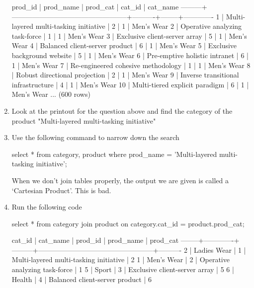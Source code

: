 \begin{enumerate}
\begin{pseudo*}
 prod_id |                    prod_name                     | prod_cat | cat_id |  cat_name     
---------+--------------------------------------------------+----------+--------+-------------  
       1 | Multi-layered multi-tasking initiative           |        2 |      1 | Men's Wear    
       2 | Operative analyzing task-force                   |        1 |      1 | Men's Wear    
       3 | Exclusive client-server array                    |        5 |      1 | Men's Wear    
       4 | Balanced client-server product                   |        6 |      1 | Men's Wear    
       5 | Exclusive background website                     |        5 |      1 | Men's Wear    
       6 | Pre-emptive holistic intranet                    |        6 |      1 | Men's Wear    
       7 | Re-engineered cohesive methodology               |        1 |      1 | Men's Wear    
       8 | Robust directional projection                    |        2 |      1 | Men's Wear    
       9 | Inverse transitional infrastructure              |        4 |      1 | Men's Wear    
      10 | Multi-tiered explicit paradigm                   |        6 |      1 | Men's Wear   
...     
(600 rows)
\end{pseudo*}
\item Look at the printout for the question above and find the category of the product "Multi-layered multi-tasking initiative"
\item Use the following command to narrow down the search
\begin{sql}
select * from category, product where prod_name = 'Multi-layered multi-tasking initiative';
\end{sql}
When we don't join tables properly, the output we are given is called a `Cartesian Product'. This is bad.
\item Run the following code
\begin{sql}
select * from category
join product on category.cat_id = product.prod_cat;
\end{sql}
\begin{pseudo*}
 cat_id |  cat_name   | prod_id |                    prod_name                     | prod_cat   
--------+-------------+---------+--------------------------------------------------+----------  
      2 | Ladies Wear |       1 | Multi-layered multi-tasking initiative           |        2   
      1 | Men's Wear  |       2 | Operative analyzing task-force                   |        1   
      5 | Sport       |       3 | Exclusive client-server array                    |        5
      6 | Health      |       4 | Balanced client-server product                   |        6   

\end{pseudo*}
\end{enumerate}
